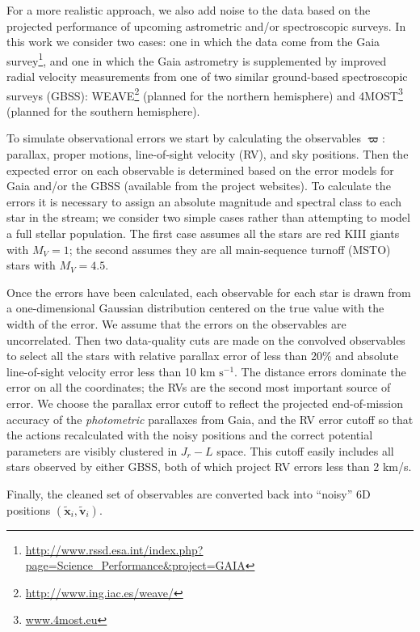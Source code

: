 \documentclass{emulateapj}
\newcommand{\unit}[2]{\ensuremath{\textrm{#1}^{#2}}}
\begin{document}
For a more realistic approach, we also add noise to the data based on the projected performance of upcoming astrometric and/or spectroscopic surveys. In this work we consider two cases: one in which the data come from the Gaia survey\footnote{\url{http://www.rssd.esa.int/index.php?page=Science_Performance&project=GAIA}}, and one in which the Gaia astrometry is supplemented by improved radial velocity measurements from one of two similar ground-based spectroscopic surveys (GBSS): WEAVE\footnote{\url{http://www.ing.iac.es/weave/}} (planned for the northern hemisphere) and 4MOST\footnote{\url{www.4most.eu}} (planned for the southern hemisphere). 

To simulate observational errors we start by calculating the observables $\mathbf{\varpi}$: parallax, proper motions, line-of-sight velocity (RV), and sky positions.  Then the expected error on each observable is determined based on the error models for Gaia and/or the GBSS (available from the project websites). To calculate the errors it is necessary to assign an absolute magnitude and spectral class to each star in the stream; we consider two simple cases rather than attempting to model a full stellar population. The first case assumes all the stars are red KIII giants with $M_V = 1$; the second assumes they are all main-sequence turnoff (MSTO) stars with $M_V = 4.5$. 

Once the errors have been calculated, each observable for each star is drawn from a one-dimensional Gaussian distribution centered on the true value with the width of the error. We assume that the errors on the observables are uncorrelated.  Then two data-quality cuts are made on the convolved observables to select all the stars with relative parallax error of less than 20\% and absolute line-of-sight velocity error less than 10 km \unit{s}{-1}. The distance errors dominate the error on all the coordinates; the RVs are the second most important source of error. We choose the parallax error cutoff to reflect the projected end-of-mission accuracy of the \emph{photometric} parallaxes from Gaia, and the RV error cutoff so that the actions recalculated with the noisy positions and the correct potential parameters are visibly clustered in $J_r-L$ space. This cutoff easily includes all stars observed by either GBSS, both of which project RV errors less than 2 km/s.

Finally, the cleaned set of observables are converted back into ``noisy'' 6D positions $(\tilde{\mathbf{x}}_i,\tilde{\mathbf{v}}_i)$. 
\end{document}

